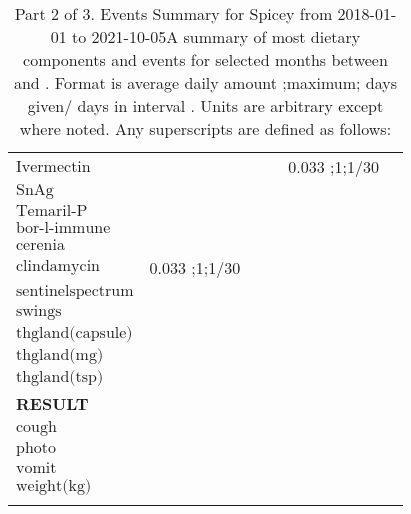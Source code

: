 \begin{table}[H]
\begin{tabular}{|l|r|r|r|r|r|}
$\textrm{Ivermectin}$&&&&0.033 ;1;1/30&\\
$\textrm{SnAg}$&&&&&\\
$\textrm{Temaril-P}$&&&&&\\
$\textrm{bor-l-immune}$&&&&&\\
$\textrm{cerenia}$&&&&&\\
$\textrm{clindamycin}$&0.033 ;1;1/30&&&&\\
$\textrm{sentinelspectrum}$&&&&&\\
$\textrm{swings}$&&&&&\\
$\textrm{thgland(capsule)}$&&&&&\\
$\textrm{thgland(mg)}$&&&&&\\
$\textrm{thgland(tsp)}$&&&&&\\
{\bf RESULT}&&&&&\\
$\textrm{cough}$&&&&&\\
$\textrm{photo}$&&&&&\\
$\textrm{vomit}$&&&&&\\
$\textrm{weight(kg)}$&&&&&\\
&&&&&\\
\hline
\end{tabular}
\caption{Part 2 of 3.  Events Summary for Spicey   from 2018-01-01 to 2021-10-05A summary of most dietary components and events  for selected months between \mjmdatemin and \mjmdatemax. Format is average daily amount ;maximum; days given/ days in interval . Units are arbitrary except where noted. Any  superscripts are defined as follows:  \mjmsuperscripts}
\end{table}

